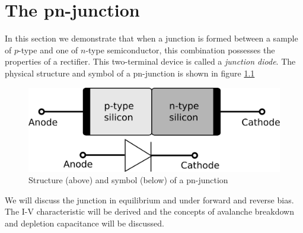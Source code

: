 \chapter{The pn-junction}
\label{ch:pnjunction}

In this section we demonstrate that when a junction is formed between a sample of $p$-type and one of $n$-type semiconductor, this combination possesses the properties of a rectifier. This two-terminal device is called a \emph{junction diode}. The physical structure and symbol  of a pn-junction is shown in figure \ref{fig:pnjunction}

\begin{figure}[h!]
\centering
\includegraphics[width=12cm]{figures/ch01/pnjunction.png}
\caption{Structure (above) and symbol (below) of a pn-junction} 
\label{fig:pnjunction}
\end{figure}

We will discuss the junction in equilibrium and under forward and reverse bias. The I-V characteristic will be derived and the concepts of avalanche breakdown and depletion capacitance will be discussed.

